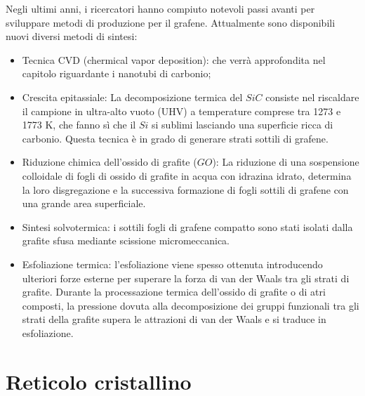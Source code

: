 \documentclass[a4paper,titlepage]{book}
\begin{document}
Negli ultimi anni, i ricercatori hanno compiuto notevoli passi avanti per sviluppare metodi di produzione per il grafene. Attualmente sono disponibili nuovi diversi metodi di sintesi:
\begin{itemize}
	\item Tecnica CVD (chermical vapor deposition): che verrà approfondita nel capitolo riguardante i nanotubi di carbonio; 
	\item Crescita epitassiale: La decomposizione termica del $SiC$ consiste nel riscaldare il campione in ultra-alto vuoto (UHV) a temperature comprese tra 1273 e 1773 K, che fanno sì che il $Si$ si sublimi lasciando una superficie ricca di carbonio. Questa tecnica è in grado di generare strati sottili di grafene.
	\item Riduzione chimica dell'ossido di grafite ($GO$): La riduzione di una sospensione colloidale di fogli di ossido di grafite in acqua con idrazina idrato, determina la loro disgregazione e la successiva formazione di fogli sottili di grafene con una grande area superficiale.
	\item Sintesi solvotermica: i sottili fogli di grafene compatto sono stati isolati dalla grafite sfusa mediante scissione micromeccanica.
	\item Esfoliazione termica: l'esfoliazione viene spesso ottenuta introducendo ulteriori forze esterne per superare la forza di van der Waals tra gli strati di grafite. Durante la processazione termica dell'ossido di grafite o di atri composti, la pressione dovuta alla decomposizione dei gruppi funzionali tra gli strati della grafite supera le attrazioni di van der Waals e si traduce in esfoliazione.
\end{itemize}

\section{Reticolo cristallino}
\end{document}
